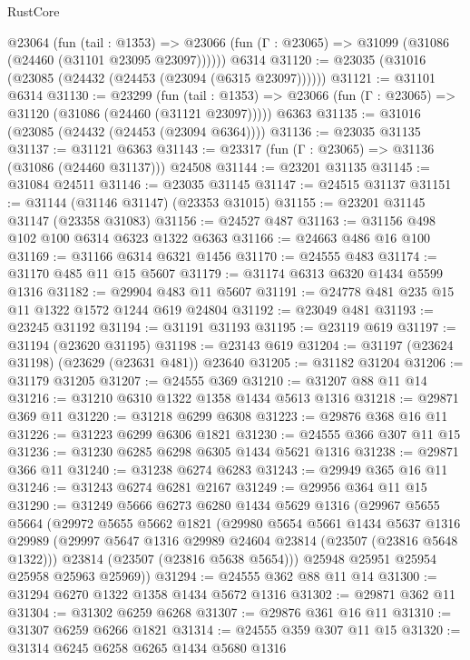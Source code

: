 \begin{lexlean}{RustCore}
\begin{coremodule}
    @23064
      (fun (tail : @1353) =>
      @23066 (fun (Γ : @23065) => @31099 (@31086 (@24460 (@31101 @23095 @23097))))))
    @6314
@31120 := @23035 (@31016 (@23085 (@24432 (@24453 (@23094 (@6315 @23097))))))
@31121 := @31101 @6314
@31130 := @23299
    (fun (tail : @1353) => @23066 (fun (Γ : @23065) => @31120 (@31086 (@24460 (@31121 @23097)))))
    @6363
@31135 := @31016 (@23085 (@24432 (@24453 (@23094 @6364))))
@31136 := @23035 @31135
@31137 := @31121 @6363
@31143 := @23317 (fun (Γ : @23065) => @31136 (@31086 (@24460 @31137))) @24508
@31144 := @23201 @31135
@31145 := @31084 @24511
@31146 := @23035 @31145
@31147 := @24515 @31137
@31151 := @31144 (@31146 @31147) (@23353 @31015)
@31155 := @23201 @31145 @31147 (@23358 @31083)
@31156 := @24527 @487
@31163 := @31156 @498 @102 @100 @6314 @6323 @1322 @6363
@31166 := @24663 @486 @16 @100
@31169 := @31166 @6314 @6321 @1456
@31170 := @24555 @483
@31174 := @31170 @485 @11 @15 @5607
@31179 := @31174 @6313 @6320 @1434 @5599 @1316
@31182 := @29904 @483 @11 @5607
@31191 := @24778 @481 @235 @15 @11 @1322 @1572 @1244 @619 @24804
@31192 := @23049 @481
@31193 := @23245 @31192
@31194 := @31191 @31193
@31195 := @23119 @619
@31197 := @31194 (@23620 @31195)
@31198 := @23143 @619
@31204 := @31197 (@23624 @31198) (@23629 (@23631 @481)) @23640
@31205 := @31182 @31204
@31206 := @31179 @31205
@31207 := @24555 @369
@31210 := @31207 @88 @11 @14
@31216 := @31210 @6310 @1322 @1358 @1434 @5613 @1316
@31218 := @29871 @369 @11
@31220 := @31218 @6299 @6308
@31223 := @29876 @368 @16 @11
@31226 := @31223 @6299 @6306 @1821
@31230 := @24555 @366 @307 @11 @15
@31236 := @31230 @6285 @6298 @6305 @1434 @5621 @1316
@31238 := @29871 @366 @11
@31240 := @31238 @6274 @6283
@31243 := @29949 @365 @16 @11
@31246 := @31243 @6274 @6281 @2167
@31249 := @29956 @364 @11 @15
@31290 := @31249
    @5666
    @6273
    @6280
    @1434
    @5629
    @1316
    (@29967
      @5655
      @5664
      (@29972
        @5655
        @5662
        @1821
        (@29980
          @5654
          @5661
          @1434
          @5637
          @1316
          @29989
          (@29997 @5647 @1316 @29989 @24604 @23814 (@23507 (@23816 @5648 @1322)))
          @23814
          (@23507 (@23816 @5638 @5654)))
        @25948
        @25951
        @25954
        @25958
        @25963
        @25969))
@31294 := @24555 @362 @88 @11 @14
@31300 := @31294 @6270 @1322 @1358 @1434 @5672 @1316
@31302 := @29871 @362 @11
@31304 := @31302 @6259 @6268
@31307 := @29876 @361 @16 @11
@31310 := @31307 @6259 @6266 @1821
@31314 := @24555 @359 @307 @11 @15
@31320 := @31314 @6245 @6258 @6265 @1434 @5680 @1316

\end{coremodule}
\end{lexlean}

